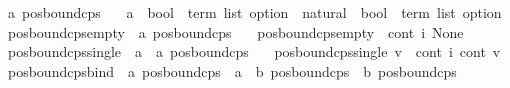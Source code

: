 \begin{isabellebody}
\isanewline
{}\isamarkupfalse%
\ {\isacharprime}{\kern0pt}a\ pos{\isacharunderscore}{\kern0pt}bound{\isacharunderscore}{\kern0pt}cps\ {\isacharequal}{\kern0pt}\isanewline
\ \ {\isachardoublequoteopen}{\isacharparenleft}{\kern0pt}{\isacharprime}{\kern0pt}a\ {\isasymRightarrow}\ {\isacharparenleft}{\kern0pt}bool\ {\isacharasterisk}{\kern0pt}\ term\ list{\isacharparenright}{\kern0pt}\ option{\isacharparenright}{\kern0pt}\ {\isasymRightarrow}\ natural\ {\isasymRightarrow}\ {\isacharparenleft}{\kern0pt}bool\ {\isacharasterisk}{\kern0pt}\ term\ list{\isacharparenright}{\kern0pt}\ option{\isachardoublequoteclose}\isanewline
\isanewline
{}\isamarkupfalse%
\ pos{\isacharunderscore}{\kern0pt}bound{\isacharunderscore}{\kern0pt}cps{\isacharunderscore}{\kern0pt}empty\ {\isacharcolon}{\kern0pt}{\isacharcolon}{\kern0pt}\ {\isachardoublequoteopen}{\isacharprime}{\kern0pt}a\ pos{\isacharunderscore}{\kern0pt}bound{\isacharunderscore}{\kern0pt}cps{\isachardoublequoteclose}\isanewline
\ \ \ {\isachardoublequoteopen}pos{\isacharunderscore}{\kern0pt}bound{\isacharunderscore}{\kern0pt}cps{\isacharunderscore}{\kern0pt}empty\ {\isacharequal}{\kern0pt}\ {\isacharparenleft}{\kern0pt}{\isasymlambda}cont\ i{\isachardot}{\kern0pt}\ None{\isacharparenright}{\kern0pt}{\isachardoublequoteclose}\isanewline
\isanewline
{}\isamarkupfalse%
\ pos{\isacharunderscore}{\kern0pt}bound{\isacharunderscore}{\kern0pt}cps{\isacharunderscore}{\kern0pt}single\ {\isacharcolon}{\kern0pt}{\isacharcolon}{\kern0pt}\ {\isachardoublequoteopen}{\isacharprime}{\kern0pt}a\ {\isasymRightarrow}\ {\isacharprime}{\kern0pt}a\ pos{\isacharunderscore}{\kern0pt}bound{\isacharunderscore}{\kern0pt}cps{\isachardoublequoteclose}\isanewline
\ \ \ {\isachardoublequoteopen}pos{\isacharunderscore}{\kern0pt}bound{\isacharunderscore}{\kern0pt}cps{\isacharunderscore}{\kern0pt}single\ v\ {\isacharequal}{\kern0pt}\ {\isacharparenleft}{\kern0pt}{\isasymlambda}cont\ i{\isachardot}{\kern0pt}\ cont\ v{\isacharparenright}{\kern0pt}{\isachardoublequoteclose}\isanewline
\isanewline
{}\isamarkupfalse%
\ pos{\isacharunderscore}{\kern0pt}bound{\isacharunderscore}{\kern0pt}cps{\isacharunderscore}{\kern0pt}bind\ {\isacharcolon}{\kern0pt}{\isacharcolon}{\kern0pt}\ {\isachardoublequoteopen}{\isacharprime}{\kern0pt}a\ pos{\isacharunderscore}{\kern0pt}bound{\isacharunderscore}{\kern0pt}cps\ {\isasymRightarrow}\ {\isacharparenleft}{\kern0pt}{\isacharprime}{\kern0pt}a\ {\isasymRightarrow}\ {\isacharprime}{\kern0pt}b\ pos{\isacharunderscore}{\kern0pt}bound{\isacharunderscore}{\kern0pt}cps{\isacharparenright}{\kern0pt}\ {\isasymRightarrow}\ {\isacharprime}{\kern0pt}b\ pos{\isacharunderscore}{\kern0pt}bound{\isacharunderscore}{\kern0pt}cps{\isachardoublequoteclose}\isanewline

\end{isabellebody}
